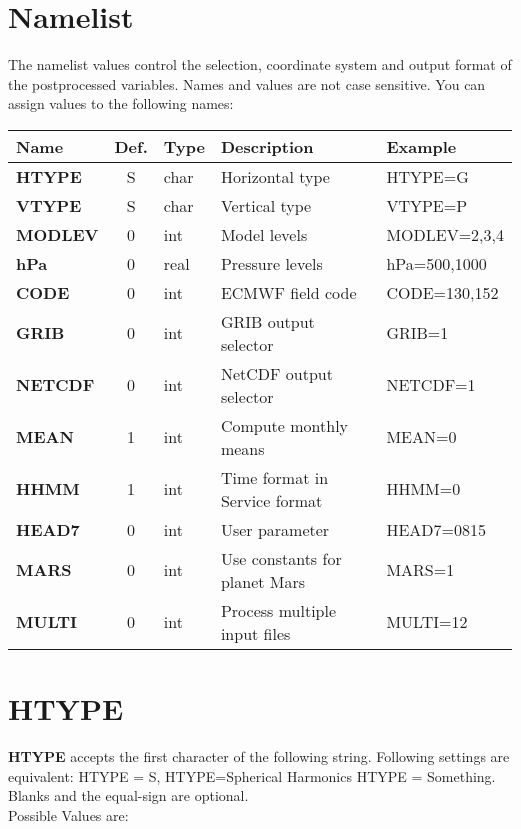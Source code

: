 \section{Namelist}

The namelist values control the selection, coordinate system
and output format of the postprocessed variables.
Names and values are not case sensitive.
You can assign values to the following names: \vspace{0.4cm}

\begin{tabular}{|l|c|l|l|l|}
\hline
Name   & Def. & Type & Description & Example \\
\hline
{\bf HTYPE  }& S & char & Horizontal type               & HTYPE=G \\
{\bf VTYPE  }& S & char & Vertical type                 & VTYPE=P \\
{\bf MODLEV }& 0 & int  & Model levels                  & MODLEV=2,3,4 \\
{\bf hPa    }& 0 & real & Pressure levels               & hPa=500,1000 \\
{\bf CODE   }& 0 & int  & ECMWF field code              & CODE=130,152 \\
{\bf GRIB   }& 0 & int  & GRIB output selector          & GRIB=1 \\
{\bf NETCDF }& 0 & int  & NetCDF output selector        & NETCDF=1 \\
{\bf MEAN   }& 1 & int  & Compute monthly means         & MEAN=0 \\
{\bf HHMM   }& 1 & int  & Time format in Service format & HHMM=0 \\
{\bf HEAD7  }& 0 & int  & User parameter                & HEAD7=0815 \\
{\bf MARS   }& 0 & int  & Use constants for planet Mars & MARS=1 \\
{\bf MULTI  }& 0 & int  & Process multiple input files  & MULTI=12 \\
\hline
\end{tabular}

\section{HTYPE}

{\bf HTYPE} accepts the first character of the following string.
Following settings are equivalent: HTYPE = S, HTYPE=Spherical Harmonics
HTYPE = Something. Blanks and the equal-sign are optional. \\
Possible Values are:

